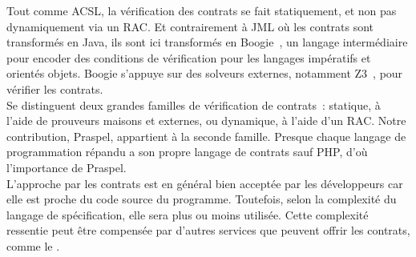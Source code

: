 Tout comme ACSL, la vérification des contrats se fait statiquement, et non pas
dynamiquement via un RAC. Et contrairement à JML où les contrats sont
transformés en Java, ils sont ici transformés en Boogie~,
un langage intermédiaire pour encoder des conditions de vérification pour les
langages impératifs et orientés objets. Boogie s'appuye sur des solveurs
externes, notamment Z3~, pour vérifier les contrats. \\

Se distinguent deux grandes familles de vérification de contrats~: statique, à
l'aide de prouveurs maisons et externes, ou dynamique, à l'aide d'un RAC. Notre
contribution, Praspel, appartient à la seconde famille.
Presque chaque langage de programmation répandu a son propre langage de contrats
sauf PHP, d'où l'importance de Praspel. \\

L'approche par les contrats est en général bien acceptée par les développeurs
car elle est proche du code source du programme. Toutefois, selon la complexité
du langage de spécification, elle sera plus ou moins utilisée. Cette complexité
ressentie peut être compensée par d'autres services que peuvent offrir les
contrats, comme le .
